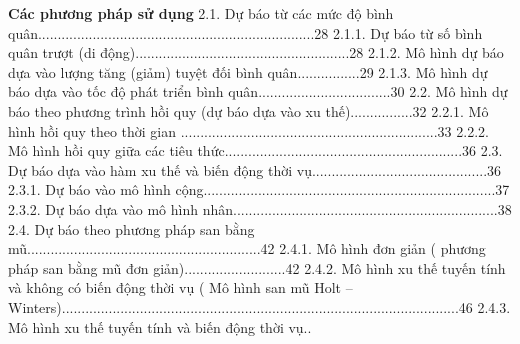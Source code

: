 \textbf{Các phương pháp sử dụng}
2.1. Dự báo từ các mức độ bình quân.......................................................................28 2.1.1. Dự báo từ số bình quân trượt (di động).......................................................28 2.1.2. Mô hình dự báo dựa vào lượng tăng (giảm) tuyệt đối bình quân................29 2.1.3. Mô hình dự báo dựa vào tốc độ phát triển bình quân..................................30 2.2. Mô hình dự báo theo phương trình hồi quy (dự báo dựa vào xu thế)................32 2.2.1. Mô hình hồi quy theo thời gian ..................................................................33 2.2.2. Mô hình hồi quy giữa các tiêu thức.............................................................36 2.3. Dự báo dựa vào hàm xu thế và biến động thời vụ.............................................36 2.3.1. Dự báo vào mô hình cộng...........................................................................37 2.3.2. Dự báo dựa vào mô hình nhân....................................................................38 2.4. Dự báo theo phương pháp san bằng mũ............................................................42 2.4.1. Mô hình đơn giản ( phương pháp san bằng mũ đơn giản)..........................42
2.4.2. Mô hình xu thế tuyến tính và không có biến động thời vụ ( Mô hình san mũ
Holt – Winters)......................................................................................................46
2.4.3. Mô hình xu thế tuyến tính và biến động thời vụ..